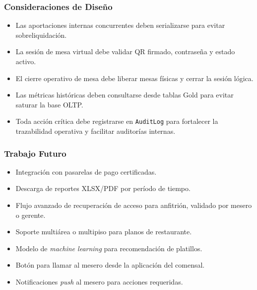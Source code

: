 \subsubsection{Consideraciones de Diseño}

\begin{itemize}[leftmargin=1.5em]
  \item Las aportaciones internas concurrentes deben serializarse para evitar
  sobreliquidación.
  \item La sesión de mesa virtual debe validar QR firmado, contraseña y estado activo.
  \item El cierre operativo de mesa debe liberar mesas físicas y cerrar la sesión lógica.
  \item Las métricas históricas deben consultarse desde tablas Gold para evitar saturar
  la base OLTP.
  \item Toda acción crítica debe registrarse en \texttt{AuditLog} para fortalecer la
  trazabilidad operativa y facilitar auditorías internas.
\end{itemize}

\subsubsection{Trabajo Futuro}

\begin{itemize}[leftmargin=1.5em]
  \item Integración con pasarelas de pago certificadas.
  \item Descarga de reportes XLSX/PDF por período de tiempo.
  \item Flujo avanzado de recuperación de acceso para anfitrión, validado por mesero
  o gerente.
  \item Soporte multiárea o multipiso para planos de restaurante.
  \item Modelo de \textit{machine learning} para recomendación de platillos.
  \item Botón para llamar al mesero desde la aplicación del comensal.
  \item Notificaciones \textit{push} al mesero para acciones requeridas.
\end{itemize}
